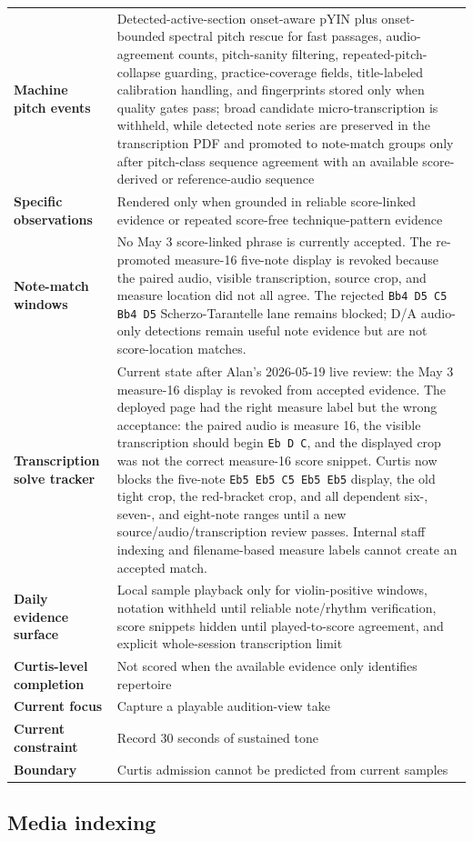 \documentclass[12pt,letterpaper]{article}
\newcommand{\metric}[2]{\textbf{#1} & #2\\}
\begin{document}
\begin{table}[htbp]
\begin{tabularx}{\textwidth}{>{\bfseries}p{}X}
\metric{Machine pitch events}{Detected-active-section onset-aware pYIN plus onset-bounded spectral pitch rescue for fast passages, audio-agreement counts, pitch-sanity filtering, repeated-pitch-collapse guarding, practice-coverage fields, title-labeled calibration handling, and fingerprints stored only when quality gates pass; broad candidate micro-transcription is withheld, while detected note series are preserved in the transcription PDF and promoted to note-match groups only after pitch-class sequence agreement with an available score-derived or reference-audio sequence}
\metric{Specific observations}{Rendered only when grounded in reliable score-linked evidence or repeated score-free technique-pattern evidence}
\metric{Note-match windows}{No May 3 score-linked phrase is currently accepted. The re-promoted measure-16 five-note display is revoked because the paired audio, visible transcription, source crop, and measure location did not all agree. The rejected \texttt{Bb4 D5 C5 Bb4 D5} Scherzo-Tarantelle lane remains blocked; D/A audio-only detections remain useful note evidence but are not score-location matches.}
\metric{Transcription solve tracker}{Current state after Alan's 2026-05-19 live review: the May 3 measure-16 display is revoked from accepted evidence. The deployed page had the right measure label but the wrong acceptance: the paired audio is measure 16, the visible transcription should begin \texttt{Eb D C}, and the displayed crop was not the correct measure-16 score snippet. Curtis now blocks the five-note \texttt{Eb5 Eb5 C5 Eb5 Eb5} display, the old tight crop, the red-bracket crop, and all dependent six-, seven-, and eight-note ranges until a new source/audio/transcription review passes. Internal staff indexing and filename-based measure labels cannot create an accepted match.}
\metric{Daily evidence surface}{Local sample playback only for violin-positive windows, notation withheld until reliable note/rhythm verification, score snippets hidden until played-to-score agreement, and explicit whole-session transcription limit}
\metric{Curtis-level completion}{Not scored when the available evidence only identifies repertoire}
\metric{Current focus}{Capture a playable audition-view take}
\metric{Current constraint}{Record 30 seconds of sustained tone}
\metric{Boundary}{Curtis admission cannot be predicted from current samples}
\bottomrule
\end{tabularx}
\end{table}

\subsection{Media indexing}
\end{document}
